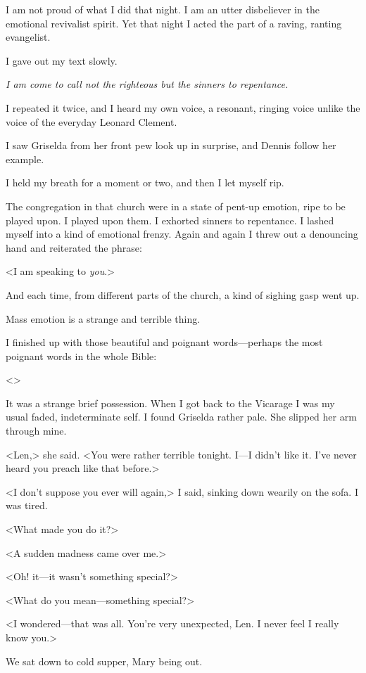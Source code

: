 I am not proud of what I did that night. I am an utter disbeliever in the emotional revivalist spirit. Yet that night I acted the part of a raving, ranting evangelist.

I gave out my text slowly.

\emph{I am come to call not the righteous but the sinners to repentance.}

I repeated it twice, and I heard my own voice, a resonant, ringing voice unlike the voice of the everyday Leonard Clement.

I saw Griselda from her front pew look up in surprise, and Dennis follow her example.

I held my breath for a moment or two, and then I let myself rip.

The congregation in that church were in a state of pent-up emotion, ripe to be played upon. I played upon them. I exhorted sinners to repentance. I lashed myself into a kind of emotional frenzy. Again and again I threw out a denouncing hand and reiterated the phrase:

<I am speaking to \emph{you}.>

And each time, from different parts of the church, a kind of sighing gasp went up.

Mass emotion is a strange and terrible thing.

I finished up with those beautiful and poignant words—perhaps the most poignant words in the whole Bible:

<>

It was a strange brief possession. When I got back to the Vicarage I was my usual faded, indeterminate self. I found Griselda rather pale. She slipped her arm through mine.

<Len,> she said. <You were rather terrible tonight. I—I didn't like it. I've never heard you preach like that before.>

<I don't suppose you ever will again,> I said, sinking down wearily on the sofa. I was tired.

<What made you do it?>

<A sudden madness came over me.>

<Oh! it—it wasn't something special?>

<What do you mean—something special?>

<I wondered—that was all. You're very unexpected, Len. I never feel I really know you.>

We sat down to cold supper, Mary being out.

